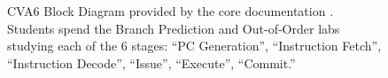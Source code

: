 
\begin{figure}[t]
    \centering
    \caption[
        CVA6 Block Diagram
    ]{
        CVA6 Block Diagram provided by the core documentation \cite{cva6}.
        Students spend the Branch Prediction and Out-of-Order labs studying each of the 6 stages: \enquote{PC Generation}, \enquote{Instruction Fetch}, \enquote{Instruction Decode}, \enquote{Issue}, \enquote{Execute}, \enquote{Commit.}
    }
    \label{fig:cva6_overview}
\end{figure}
